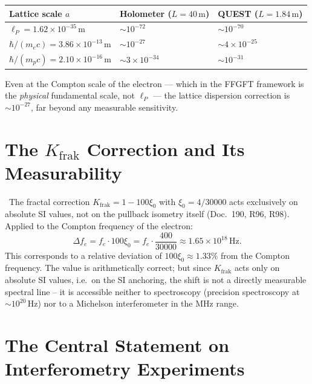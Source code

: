 \KM

\begin{center}
\begin{tabular}{lll}
\toprule
Lattice scale $a$ & Holometer ($L=40\,\text{m}$) & QUEST ($L=1.84\,\text{m}$) \\
\midrule
$\ell_P = 1.62\times10^{-35}\,\text{m}$ & $\sim 10^{-72}$ & $\sim 10^{-70}$ \\
$\hbar/(m_e c) = 3.86\times10^{-13}\,\text{m}$ & $\sim 10^{-27}$ & $\sim 4\times10^{-25}$ \\
$\hbar/(m_p c) = 2.10\times10^{-16}\,\text{m}$ & $\sim 3\times10^{-34}$ & $\sim 10^{-31}$ \\
\bottomrule
\end{tabular}
\end{center}

Even at the Compton scale of the electron --- which in the FFGFT framework
is the \emph{physical} fundamental scale, not $\ell_P$ --- the lattice
dispersion correction is $\sim10^{-27}$, far beyond any measurable
sensitivity.

\section{The $K_\text{frak}$ Correction and Its Measurability}

\KM\ The fractal correction $K_\text{frak} = 1 - 100\xi_0$ with $\xi_0 = 4/30000$
acts exclusively on absolute SI values, not on the pullback isometry itself
(Doc.~190, R96, R98). Applied to the Compton frequency of the electron:
\begin{equation}
\Delta f_e = f_e \cdot 100\xi_0 = f_e \cdot \frac{400}{30000}
\approx 1.65\times10^{18}\,\text{Hz}.
\end{equation}
This corresponds to a relative deviation of $100\xi_0 \approx 1.33\%$
from the Compton frequency. The value is arithmetically correct; but since $K_\text{frak}$ acts only on
absolute SI values, i.e.\ on the SI anchoring, the shift is not a directly
measurable spectral line -- it is accessible neither to spectroscopy
(precision spectroscopy at $\sim10^{20}\,\text{Hz}$) nor to a Michelson
interferometer in the MHz range.

\section{The Central Statement on Interferometry Experiments}

